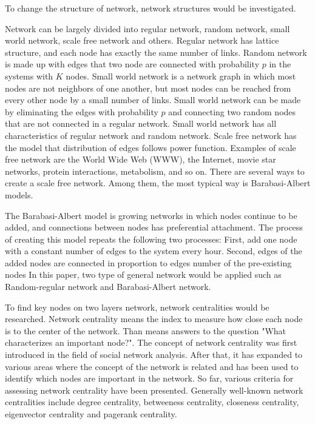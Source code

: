 To change the structure of network, network structures would be investigated.   

Network can be largely divided into regular network, random network\cite{erdos1960}, small world network\cite{watts1998}, scale free network\cite{barabasi1999} and others. 
Regular network has lattice structure, and  each node has exactly the same number of links.
Random network is made up with edges that two node are connected with probability $p$ in the systems with $K$ nodes. 
Small world network is a network graph in which most nodes are not neighbors of one another, but most nodes can be reached from every other node by a small number of links. Small world network can be made by eliminating the edges with probability $p$ and connecting two random nodes that are not connected in a regular network. Small world network has all characteristics of regular network and random network.
Scale free network has the model that distribution of edges follows power function. Examples of scale free network are the World Wide Web (WWW), the Internet, movie star networks, protein interactions, metabolism, and so on.
There are several ways to create a scale free network. Among them,  the most typical way is Barabasi-Albert models.


The Barabasi-Albert model is growing networks in which nodes continue to be added, and connections between nodes has preferential attachment. The process of creating this model repeats the following two processes: First, add one node with a constant number of edges to the system every hour. Second, edges of the added nodes are connected in proportion to edges number of the pre-existing nodes
In this paper, two type of general network would be applied such as Random-regular network and Barabasi-Albert network.


To find key nodes on two layers network, network centralities would be researched.
Network centrality means the index to measure how close each node is to the center of the network. Than means answers to the question "What characterizes an important node?". The concept of network centrality was first introduced in the field of social network analysis.\cite{freeman1979} After that, it has expanded to various areas where the concept of the network is related and has been used to identify which nodes are important in the network. So far, various criteria for assessing network centrality have been presented. Generally well-known network centralities include degree centrality, betweeness centrality, closeness centrality, eigenvector centrality and pagerank centrality.\cite{koschutzki2008}

